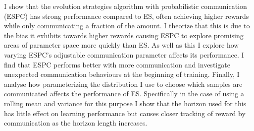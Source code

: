 I show that the evolution strategies algorithm with probabilistic communication (ESPC) has strong performance compared to ES, often achieving higher rewards while only communicating a fraction of the amount. I theorize that this is due to the bias it exhibits towards higher rewards causing ESPC to explore promising areas of parameter space more quickly than ES.
As well as this I explore how varying ESPC's adjustable communication parameter affects its performance. I find that ESPC performs better with more communication and investigate unexpected communication behaviours at the beginning of training. Finally, I analyse how parameterizing the distribution I use to choose which samples are communicated affects the performance of ES. Specifically in the case of using a rolling mean and variance for this purpose I show that the horizon used for this has little effect on learning performance but causes closer tracking of reward by communication as the horizon length increases.
